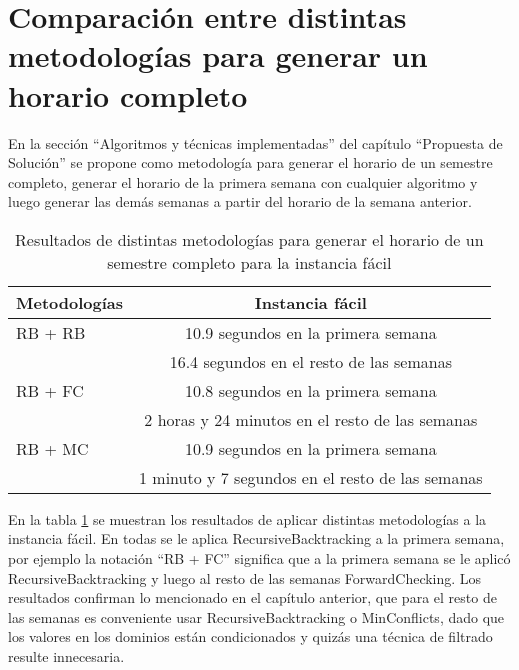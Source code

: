 \section{Comparaci\'on entre distintas metodolog\'ias para generar un horario completo}

En la secci\'on ``Algoritmos y t\'ecnicas implementadas'' del cap\'itulo ``Propuesta de Solución'' se propone como metodolog\'ia para generar el horario de un semestre completo, generar el horario de la primera semana con cualquier algoritmo y luego generar las dem\'as semanas a partir del horario de la semana anterior.

\begin{table}[h]
	\caption{Resultados de distintas metodolog\'ias para generar el horario de un semestre completo para la instancia f\'acil}
	\begin{center}
		\label{semestre}
		\begin{tabular}{|l|c||}
			\hline \hline
			Metodolog\'ias & Instancia f\'acil \\ \hline
			RB + RB & 10.9 segundos en la primera semana \\
			 & 16.4 segundos en el resto de las semanas \\ \hline
			RB + FC & 10.8 segundos en la primera semana \\
			 & 2 horas y 24 minutos en el resto de las semanas \\ \hline
			RB + MC & 10.9 segundos en la primera semana \\
			 & 1 minuto y 7 segundos en el resto de las semanas \\ \hline
		\end{tabular}
	\end{center}
\end{table}

En la tabla \ref{semestre} se muestran los resultados de aplicar distintas metodolog\'ias a la instancia f\'acil. En todas se le aplica \textsf{RecursiveBacktracking} a la primera semana, por ejemplo la notaci\'on ``RB + FC'' significa que a la primera semana se le aplic\'o \textsf{RecursiveBacktracking} y luego al resto de las semanas \textsf{ForwardChecking}. Los resultados confirman lo mencionado en el cap\'itulo anterior, que para el resto de las semanas es conveniente usar \textsf{RecursiveBacktracking} o \textsf{MinConflicts}, dado que los valores en los dominios est\'an condicionados y quiz\'as una t\'ecnica de filtrado resulte innecesaria.

